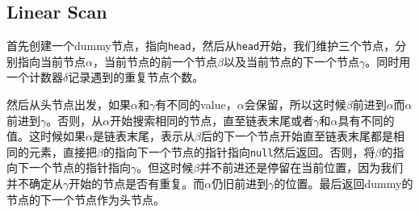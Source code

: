 \subsection{Linear Scan}
\begin{CJK*}{UTF8}{gbsn}
首先创建一个dummy节点，指向\texttt{head}，然后从\texttt{head}开始，我们维护三个节点，分别指向当前节点$\alpha$，当前节点的前一个节点$\beta$以及当前节点的下一个节点$\gamma$。同时用一个计数器$\delta$记录遇到的重复节点个数。
\par
然后从头节点出发，如果$\alpha$和$\gamma$有不同的value，$\alpha$会保留，所以这时候$\beta$前进到$\alpha$而$\alpha$前进到$\gamma$。否则，从$\alpha$开始搜索相同的节点，直至链表末尾或者$\gamma$和$\alpha$具有不同的值。这时候如果$\alpha$是链表末尾，表示从$\beta$后的下一个节点开始直至链表末尾都是相同的元素，直接把$\beta$的指向下一个节点的指针指向\texttt{null}然后返回。否则，将$\beta$的指向下一个节点的指针指向$\gamma$。但这时候$\beta$并不前进还是停留在当前位置，因为我们并不确定从$\gamma$开始的节点是否有重复。而$\alpha$仍旧前进到$\gamma$的位置。最后返回dummy的节点的下一个节点作为头节点。 
\end{CJK*}
